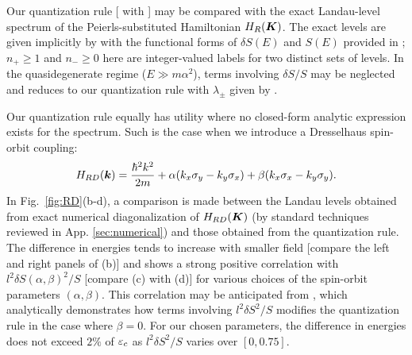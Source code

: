 \documentclass[aps, prb, showpacs, twocolumn, notitlepage, superscriptaddress]{revtex4-1}
\begin{document}

Our quantization rule [ with ] may be compared with the  exact Landau-level spectrum of the Peierls-substituted Hamiltonian $H_R(\boldsymbol{K})$. The exact levels are given implicitly by
with the functional forms of $\delta S(E)$ and $S(E)$ provided in ;  $n_{+}{\ge} 1$ and $n_-{\ge} 0$ here are integer-valued labels for two distinct sets of levels.  In the quasidegenerate regime ($E{\gg}m\alpha^2$), terms involving $\delta S/S$ may be neglected and  reduces to our quantization rule with $\lambda_{\pm}$ given by .

Our quantization rule equally has utility where no closed-form analytic expression exists for the spectrum. Such is the case when we introduce a Dresselhaus spin-orbit coupling:
\begin{equation}
 H_{RD}(\boldsymbol{k})=\frac{{\hbar^2}k^2}{2m}+\alpha(k_{x}\sigma_{y}-k_{y}\sigma_{x})+\beta(k_{x}\sigma_{x}-k_{y}\sigma_{y}).\label{hamRD}
\end{equation}
In Fig.\ \ref{fig:RD}(b-d), a comparison is made between the Landau levels obtained from exact numerical diagonalization of $H_{RD}(\boldsymbol{K})$ (by standard techniques reviewed in App. \ref{sec:numerical}) and those obtained from the quantization rule. The difference in energies tends to increase with smaller field [compare the left and right panels of   (b)] and shows a strong positive correlation with $l^2\delta S(\alpha,\beta)^2/S$ [compare (c) with (d)] for various choices of the spin-orbit parameters $(\alpha,\beta)$. This correlation may be anticipated from , which analytically demonstrates how terms involving $l^2\delta S^2/S$ modifies the quantization rule in the case where $\beta{=}0$. For our chosen parameters,  the difference in energies does not exceed $2\%$ of $\varepsilon_c$ as $l^2\delta S^2/S$ varies over $[0,0.75]$.


\end{document}
